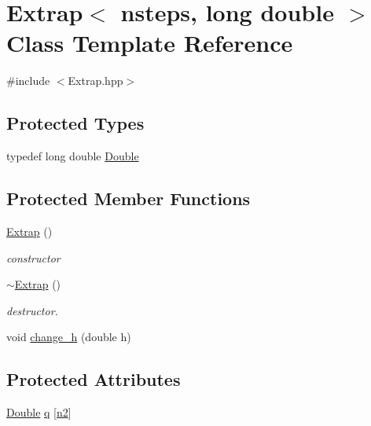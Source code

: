 \hypertarget{classExtrap_3_01nsteps_00_01long_01double_01_4}{\section{Extrap$<$ nsteps, long double $>$ Class Template Reference}
\label{classExtrap_3_01nsteps_00_01long_01double_01_4}
}


{\ttfamily \#include $<$Extrap.\-hpp$>$}

\subsection*{Protected Types}
\begin{DoxyCompactItemize}
\item 
typedef long double \hyperlink{classExtrap_3_01nsteps_00_01long_01double_01_4_a544c8de7dbaa4997c324a136e119ee65}{Double}
\end{DoxyCompactItemize}
\subsection*{Protected Member Functions}
\begin{DoxyCompactItemize}
\item 
\hyperlink{classExtrap_3_01nsteps_00_01long_01double_01_4_aea75f6046e046134747a4c4a3fd669fc}{Extrap} ()
\begin{DoxyCompactList}\small\item\em constructor \end{DoxyCompactList}\item 
\hyperlink{classExtrap_3_01nsteps_00_01long_01double_01_4_a7bf902fee0a48f00980fc2d43fcca23f}{$\sim$\-Extrap} ()
\begin{DoxyCompactList}\small\item\em destructor. \end{DoxyCompactList}\item 
void \hyperlink{classExtrap_3_01nsteps_00_01long_01double_01_4_ac55744dc2eb127c20685c4f8eeeca48e}{change\-\_\-h} (double h)
\end{DoxyCompactItemize}
\subsection*{Protected Attributes}
\begin{DoxyCompactItemize}
\item 
\hyperlink{classExtrap_3_01nsteps_00_01long_01double_01_4_a544c8de7dbaa4997c324a136e119ee65}{Double} \hyperlink{classExtrap_3_01nsteps_00_01long_01double_01_4_acde9ea9e7183d0f054fb4e8ee461ddfa}{q} \mbox{[}\hyperlink{classExtrap_3_01nsteps_00_01long_01double_01_4_a55ea56303a421b8b26a3260b815e7b62}{n2}\mbox{]}
\end{DoxyCompactItemize}
